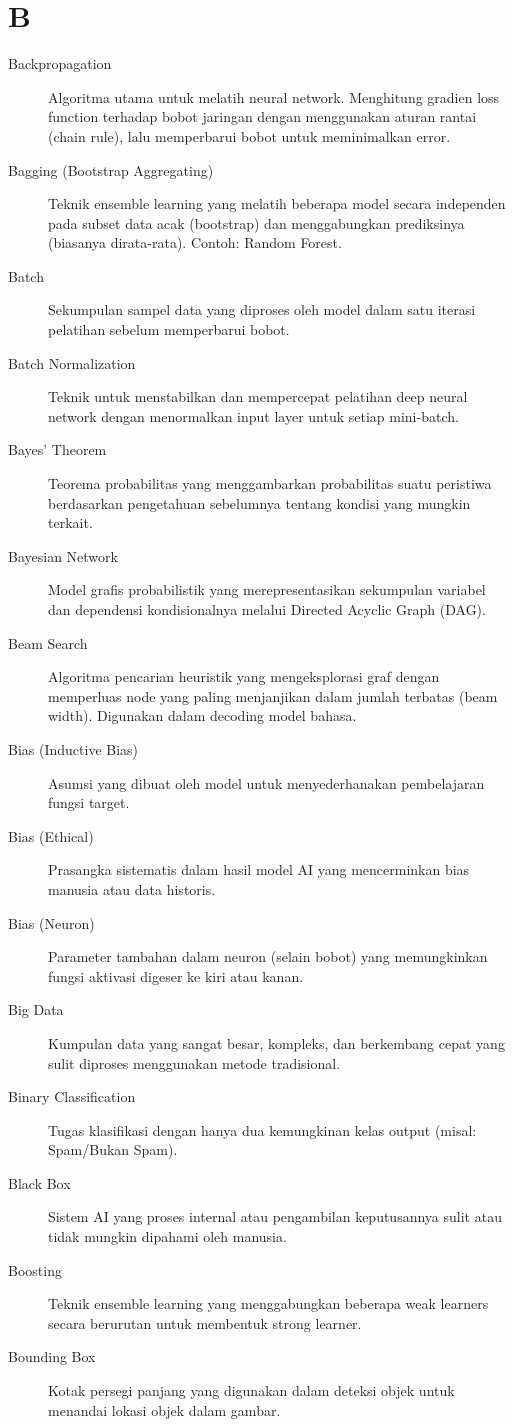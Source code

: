\section*{B}
\begin{description}
    \item[Backpropagation] Algoritma utama untuk melatih neural network. Menghitung gradien loss function terhadap bobot jaringan dengan menggunakan aturan rantai (chain rule), lalu memperbarui bobot untuk meminimalkan error.
    \item[Bagging (Bootstrap Aggregating)] Teknik ensemble learning yang melatih beberapa model secara independen pada subset data acak (bootstrap) dan menggabungkan prediksinya (biasanya dirata-rata). Contoh: Random Forest.
    \item[Batch] Sekumpulan sampel data yang diproses oleh model dalam satu iterasi pelatihan sebelum memperbarui bobot.
    \item[Batch Normalization] Teknik untuk menstabilkan dan mempercepat pelatihan deep neural network dengan menormalkan input layer untuk setiap mini-batch.
    \item[Bayes' Theorem] Teorema probabilitas yang menggambarkan probabilitas suatu peristiwa berdasarkan pengetahuan sebelumnya tentang kondisi yang mungkin terkait.
    \item[Bayesian Network] Model grafis probabilistik yang merepresentasikan sekumpulan variabel dan dependensi kondisionalnya melalui Directed Acyclic Graph (DAG).
    \item[Beam Search] Algoritma pencarian heuristik yang mengeksplorasi graf dengan memperluas node yang paling menjanjikan dalam jumlah terbatas (beam width). Digunakan dalam decoding model bahasa.
    \item[Bias (Inductive Bias)] Asumsi yang dibuat oleh model untuk menyederhanakan pembelajaran fungsi target.
    \item[Bias (Ethical)] Prasangka sistematis dalam hasil model AI yang mencerminkan bias manusia atau data historis.
    \item[Bias (Neuron)] Parameter tambahan dalam neuron (selain bobot) yang memungkinkan fungsi aktivasi digeser ke kiri atau kanan.
    \item[Big Data] Kumpulan data yang sangat besar, kompleks, dan berkembang cepat yang sulit diproses menggunakan metode tradisional.
    \item[Binary Classification] Tugas klasifikasi dengan hanya dua kemungkinan kelas output (misal: Spam/Bukan Spam).
    \item[Black Box] Sistem AI yang proses internal atau pengambilan keputusannya sulit atau tidak mungkin dipahami oleh manusia.
    \item[Boosting] Teknik ensemble learning yang menggabungkan beberapa weak learners secara berurutan untuk membentuk strong learner.
    \item[Bounding Box] Kotak persegi panjang yang digunakan dalam deteksi objek untuk menandai lokasi objek dalam gambar.
\end{description}

